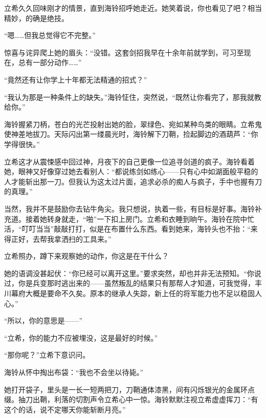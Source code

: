 \documentclass{article}
\begin{document}
立希久久回味刚才的情景，直到海铃招呼她走近。她笑着说，你也看见了吧？相当精妙，的确是绝技。



“嗯……但我总觉得它不完整。”



惊喜与诧异爬上她的眉头：“没错。这套剑招我早在十余年前就学到，可习至现在，总有一部分动作……”



“竟然还有让你学上十年都无法精通的招式？”



“我认为那是一种条件上的缺失。”海铃怔住，突然说，“既然让你看完了，那我就教给你。”



海铃握紧刀柄，苍白的光芒投射出她的脸，翠绿色、宛如某种鸟类的眼睛。立希鬼使神差地拔刀。天际闪出第一缕晨光时，海铃解下刀鞘，捡起脚边的酒葫芦：“你学得很快。”



立希这才从震悚感中回过神，月夜下的自己更像一位追寻剑道的疯子。海铃看着她，眼神又好像穿过她去看别人：“都说练剑如练心——只有心中如湖面般平稳的人才能斩出那一刀。但我认为这太过片面，追求必杀的痴人与疯子，手中也握有刀的真理。”



当然，我并不是鼓励你去钻牛角尖。我只想说，执着一些，有目标是好事。海铃补充道。接着她转身就走，“啪”一下扣上房门。立希和衣睡到晌午。海铃在院中忙活，“叮叮当当”敲敲打打，似是在布置什么东西。看到她来，海铃头也不抬：“来得正好，去帮我拿洒扫的工具来。”



立希照办，蹲下来观察她的动作，你这是在干什么？



她的语调没甚起伏：“你已经可以离开这里。”要求突然，却也并非无法预知。“你说过，你是兵变那时逃出来的——虽然叛乱的结果只有那帮人才知道，可我觉得，丰川幕府大概是要命不久矣。原本的继承人失踪，新上任的将军能力也不足以稳固人心。”



“所以，你的意思是——”



“立希，你的能力不应被埋没，这是最好的时候。”



“那你呢？”立希下意识问。



海铃从怀中掏出布袋：“我也不会坐以待毙。”



她打开袋子，里头是一长一短两把刀，刀鞘通体漆黑，间有闪烁银光的金属环点缀。抽刀出鞘，利落的切割声令立希心中一惊。海铃默默注视立希虚虚挥刀：“有这个的话，说不定哪天你能斩断月亮。”
\end{document}
